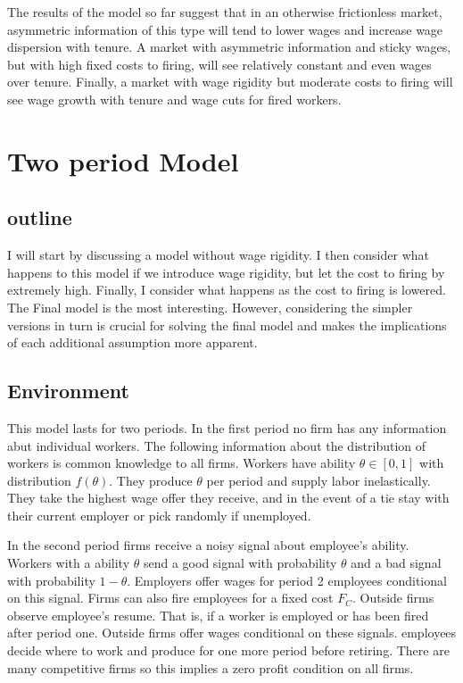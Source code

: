 \documentclass[11pt]{article}
\begin{document}
	The results of the model so far suggest that in an otherwise frictionless market, asymmetric information of this type will tend to lower wages and increase wage dispersion with tenure. A market with asymmetric information and sticky wages, but with high fixed costs to firing, will see relatively constant and even wages over tenure. Finally, a market with wage rigidity but moderate costs to firing will see wage growth with tenure and wage cuts for fired workers. 

	\section{ Two period Model}
	\subsection{outline}
	
	I will start by discussing a model without wage rigidity. I then consider what happens to this model if we introduce wage rigidity, but let the cost to firing by extremely high. Finally, I consider what happens as the cost to firing is lowered. The Final model is the most interesting. However, considering the simpler versions in turn is crucial for solving the final model and makes the implications of each additional assumption more apparent.  
	\subsection{Environment}
	
	This model lasts for two periods. In the first period no firm has any information abut individual workers. The following information about the distribution of workers is common knowledge to all firms. Workers have ability $\theta \in [0,1]$ with distribution $f(\theta)$. They produce $\theta$ per period and supply labor inelastically. They take the highest wage offer they receive, and in the event of a tie stay with their current employer or pick randomly if unemployed. \par
	
	In the second period firms receive a noisy signal about employee's ability. Workers with a ability $\theta$ send a good signal with probability $\theta$ and a bad signal with probability $1-\theta$. Employers offer wages for period 2 employees conditional on this signal. Firms can also fire employees for a fixed cost $F_C$. Outside firms observe employee's resume. That is, if a worker is employed or has been fired after period one. Outside firms offer wages conditional on these signals. employees decide where to work and produce for one more period before retiring. There are many competitive firms so this implies a zero profit condition on all firms. \par 
	
\end{document}
